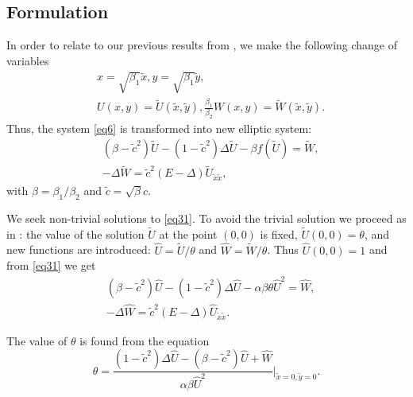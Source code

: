 \documentclass[12pt]{article}
\theoremstyle{theorem}
\theoremstyle{defi}
\begin{document}
\subsection{Formulation}


In order to relate to our previous results from \cite{ref14, ref15}, we make the following change of variables
\begin{equation}\label{eqVCN}
\begin{split}
&x=\sqrt{\beta_1} { \tilde{x} }, y=\sqrt{\beta_1} { \tilde{ y} },\\
&U(x,y)= \tilde U({ \tilde{x} },{ \tilde{y} } ), \frac{\beta_1}{\beta_2} W(x,y)=  \tilde W({ \tilde{x} },{ \tilde{y} } ).
\end{split}
\end{equation}
Thus, the system \eqref{eq6} is transformed into new elliptic system:
\begin{equation}\label{eq31}
\begin{split}
&(\beta-\tilde c ^2) \tilde U  -(1- \tilde c^2) \Delta \tilde U - \beta f( \tilde U ) = \tilde W, \\
&-\Delta \tilde W = \tilde c^2 (E- \Delta) \tilde U_{\tilde x \tilde x},
\end{split}
\end{equation}
with $\beta = \beta_1 / \beta_2$ and $ \tilde c = \sqrt {\beta} c$.

We seek  non-trivial solutions to \eqref{eq31}. To avoid the trivial solution we proceed as in \cite{ref6}: the value of the solution $\tilde U$ at the point $(0,0)$ is fixed,  $\tilde U(0,0)=\theta $, and new  functions are introduced: $\widehat{U}=\tilde U /{\theta} $ and $\widehat{W}=\tilde W /{\theta} $. Thus
$ \widehat{U}(0,0)=1$ and from \eqref{eq31} we get
\begin{equation}\label{eq32}
\begin{split}
& (\beta-\tilde c^2) \widehat{U}  -(1-\tilde c^2) \Delta \widehat{U} - \alpha \beta \theta \widehat{U}^2 = \widehat{W}, \\
&-\Delta \widehat{W} = \tilde c^2 (E- \Delta) \widehat{U}_{\tilde x \tilde x}.
\end{split}
\end{equation}

The value of $\theta $ is found from the  equation
\begin{equation}\label{eqtheta}
\theta = \frac{ (1-\tilde c^2 )\Delta \widehat{U} - (\beta-\tilde c^2) \widehat{U} +\widehat{W}}{\alpha \beta  \widehat{U}^2 } |_{\tilde x=0,\tilde y=0} .
\end{equation}
\end{document}
